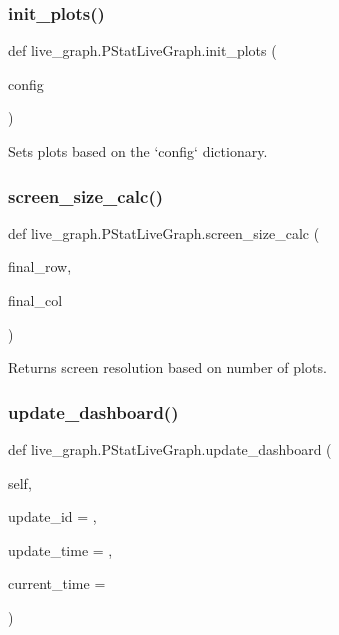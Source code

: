 \subsubsection{\texorpdfstring{init\+\_\+plots()}{init\_plots()}}
{\footnotesize\ttfamily def live\+\_\+graph.\+P\+Stat\+Live\+Graph.\+init\+\_\+plots (\begin{DoxyParamCaption}\item[{}]{config }\end{DoxyParamCaption})}

\begin{DoxyVerb}Sets plots based on the `config` dictionary.
\end{DoxyVerb}
 \mbox{\label{classlive__graph_1_1PStatLiveGraph_a7730f214090df612485e42ae758beb3e}} 
\subsubsection{\texorpdfstring{screen\+\_\+size\+\_\+calc()}{screen\_size\_calc()}}
{\footnotesize\ttfamily def live\+\_\+graph.\+P\+Stat\+Live\+Graph.\+screen\+\_\+size\+\_\+calc (\begin{DoxyParamCaption}\item[{}]{final\+\_\+row,  }\item[{}]{final\+\_\+col }\end{DoxyParamCaption})}

\begin{DoxyVerb}Returns screen resolution based on number of plots.
\end{DoxyVerb}
 \mbox{\label{classlive__graph_1_1PStatLiveGraph_af167003562729fe08284e8f5675b26e2}} 
\subsubsection{\texorpdfstring{update\+\_\+dashboard()}{update\_dashboard()}}
{\footnotesize\ttfamily def live\+\_\+graph.\+P\+Stat\+Live\+Graph.\+update\+\_\+dashboard (\begin{DoxyParamCaption}\item[{}]{self,  }\item[{}]{update\+\_\+id = {},  }\item[{}]{update\+\_\+time = {},  }\item[{}]{current\+\_\+time = {} }\end{DoxyParamCaption})}

